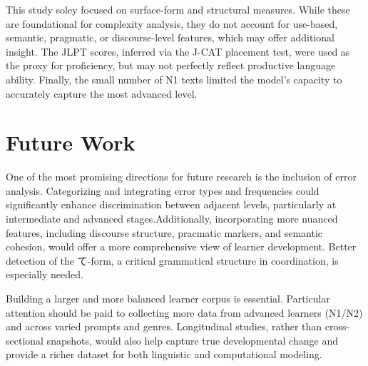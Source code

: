 This study soley focused on surface-form and structural measures. While these are foundational for complexity
analysis, they do not account for use-based, semantic, pragmatic, or discourse-level features, which may offer
additional insight. The JLPT scores, inferred via the J-CAT placement test, were used as the proxy for proficiency,
but may not perfectly reflect productive language ability. Finally, the small number of N1 texts limited the model's
capacity to accurately capture the most advanced level.

\section{Future Work}
%
%
%
%

One of the most promising directions for future research is the inclusion of error analysis. Categorizing and
integrating error types and frequencies could significantly enhance discrimination between adjacent levels,
particularly at intermediate and advanced stages.Additionally, incorporating more nuanced features, including
discourse structure, pracmatic markers, and semantic cohesion, would offer a more comprehensive view of learner
development. Better detection of the て-form, a critical grammatical structure in coordination, is especially needed.

Building a larger and more balanced learner corpus is essential. Particular attention should be paid to collecting
more data from advanced learners (N1/N2) and across varied prompts and genres. Longitudinal studies, rather than
cross-sectional snapshots, would also help capture true developmental change and provide a richer dataset for both
linguistic and computational modeling.


